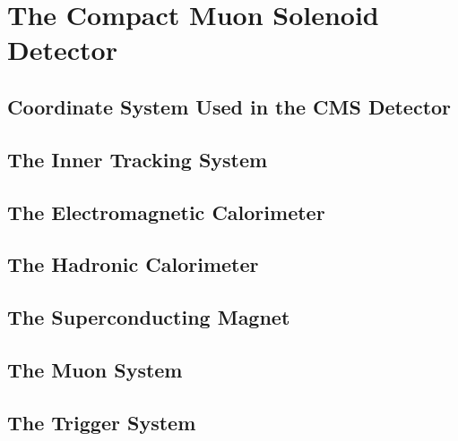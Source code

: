 \chapter{The Compact Muon Solenoid Detector}

\section{Coordinate System Used in the CMS Detector}

\section{The Inner Tracking System}

\section{The Electromagnetic Calorimeter}

\section{The Hadronic Calorimeter}

\section{The Superconducting Magnet}

\section{The Muon System}

\section{The Trigger System}